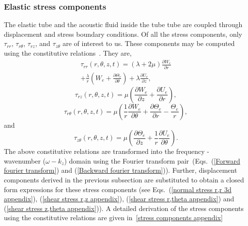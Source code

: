 \documentclass[twocolumn,10pt]{asme2ej}
\begin{document}
\subsubsection{Elastic stress components}\label{stress components 3d}
The elastic tube and the acoustic fluid inside the tube tube are coupled through displacement and stress boundary conditions. Of all the stress components, only $\tau_{rr}$, $\tau_{r\theta}$, $\tau_{rz}$, and $\tau_{z\theta}$ are of interest to us. These components may be computed using the constitutive relations~\cite{Martin2014}. They are,
\begin{multline}\label{sigma rr 3d}
    \tau_{rr}(r,\theta,z,t) = \left(\lambda+2\mu\right)\frac{\partial W_{e}}{\partial r}\\ + \frac{\lambda}{r}\left(W_{e} + \frac{\partial \Theta_e}{\partial \theta} \right) + \lambda\frac{\partial U_{e}}{\partial z},
\end{multline}
\begin{equation}\label{tau rz 3d}
    \tau_{rz}(r,\theta,z,t) = \mu\left(\frac{\partial W_{e}}{\partial z} + \frac{\partial U_{e}}{\partial r}\right),
\end{equation}
\begin{equation}\label{tau rtheta 3d}
    \tau_{r\theta}(r,\theta,z,t) = \mu\left(\frac{1}{r}\frac{\partial W_{e}}{\partial \theta} + \frac{\partial \Theta_{e}}{\partial r}-\frac{\Theta_e}{r}\right),
\end{equation}
and
\begin{equation}\label{tau ztheta 3d}
    \tau_{z\theta}(r,\theta,z,t) = \mu\left(\frac{\partial \Theta_{e}}{\partial z} + \frac{1}{r}\frac{\partial U_{e}}{\partial \theta}\right).
\end{equation}
The above constitutive relations are transformed into the frequency - wavenumber ($\omega-k_z$) domain using the Fourier transform pair~(Eqs.~(\ref{Forward fourier transform}) and (\ref{Backward fourier transform})). Further, displacement components derived in the previous subsection are substituted to obtain a closed form expressions for these stress components (see Eqs.~(\ref{normal stress r,r 3d appendix}), (\ref{shear stress r,z appendix}), (\ref{shear stress r,theta appendix}) and (\ref{shear stress z,theta appendix})). A detailed derivation of the stress components using the constitutive relations are given in~\ref{stress components appendix}
\end{document}
